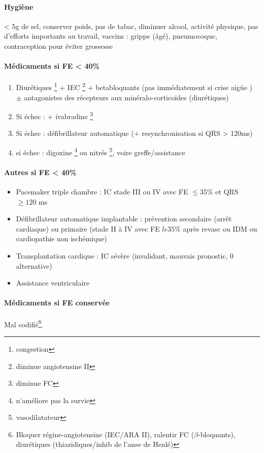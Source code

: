 \paragraph{Hygiène}
< 5g de sel, conserver poids, pas de tabac, diminuer alcool, activité physique,
pas d'efforts importants au travail, vaccins : grippe (âgé), pneumocoque,
contraception pour éviter grossesse

\paragraph{Médicaments si FE < 40\%}
\begin{enumerate}
  \item Diurétiques \footnote{congestion} + IEC \footnote{diminue angiotensine II} + betabloquants
    (\skull pas immédiatement si crise aigüe \danger{}) $\pm$ antagonistes des
    récepteurs aux minéralo-corticoïdes (diurétiques)
  \item Si échec : + ivabradine \footnote{diminue FC}
  \item Si échec : défibrillateur automatique (+ resynchronisation si QRS >
    120ms)
  \item si échec : digoxine \footnote{n'améliore pas la survie} ou nitrés \footnote{vasodilatateur}, voire greffe/assistance
\end{enumerate}

\paragraph{Autres si FE < 40\%}
\begin{itemize}
\item Pacemaker triple chambre : IC stade III ou IV avec FE $\le 35\%$ et QRS $\ge 120$ ms
\item Défibrillateur automatique implantable : prévention secondaire (arrêt
  cardiaque) ou primaire (stade II à IV avec FE $le 35\%$ après revasc ou IDM ou
  cardiopathie non ischémique)
\item Transplantation cardique : IC sévère (invalidant, mauvais pronostic, 0
  alternative)
\item Assistance ventriculaire
\end{itemize}
\paragraph{Médicaments si FE conservée}
 Mal codifié\footnote{Bloquer régine-angiotensine (IEC/ARA II), ralentir FC
($\beta$-bloquants), diurétiques (thiazidiques/inhib de l'anse de Henlé)}.

